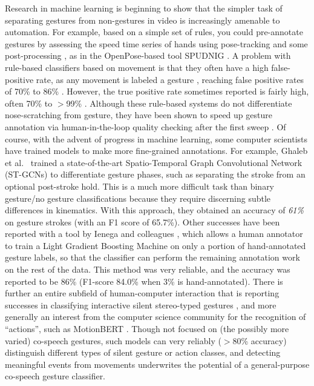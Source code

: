 \documentclass[11pt,smallheadings,cleardoublepage=empty,tocflat,numbers=noenddot,twoside,captions=tableheading]{scrbook}
\begin{document}
\begin{refsection}
Research in machine learning is beginning to show that the simpler task of separating gestures from non-gestures in video is increasingly amenable to automation. For example, based on a simple set of rules, you could pre-annotate gestures by assessing the speed time series of hands using pose-tracking and some post-processing \parencite{ripperdaSpeedingDetectionNoniconic2020, eijkCABBDatasetMultimodalundermajorrevision}, as in the OpenPose-based \parencite{caoOpenPoseRealtimeMultiPerson2021} tool SPUDNIG \parencite{ripperdaSpeedingDetectionNoniconic2020}. A problem with rule-based classifiers based on movement is that they often have a high false-positive rate, as any movement is labeled a gesture \parencite{pouwSemanticallyRelatedGestures2021}, reaching false positive rates of 70\% \parencite{ripperdaSpeedingDetectionNoniconic2020} to 86\% \parencite{pouwSemanticallyRelatedGestures2021}. However, the true positive rate sometimes reported is fairly high, often 70\% \parencite{pouwSemanticallyRelatedGestures2021} to $>$99\% \parencite{ripperdaSpeedingDetectionNoniconic2020}. Although these rule-based systems do not differentiate nose-scratching from gesture, they have been shown to speed up gesture annotation via human-in-the-loop quality checking after the first sweep \parencite{ripperdaSpeedingDetectionNoniconic2020}. Of course, with the advent of progress in machine learning, some computer scientists have trained models to make more fine-grained annotations. For example, Ghaleb et al.~\parencite{ghalebCoSpeechGestureDetection2024} trained a state-of-the-art Spatio-Temporal Graph Convolutional
Network (ST-GCNs) to differentiate gesture phases, such as separating the stroke from an optional post-stroke hold. This is a much more difficult task than binary gesture/no gesture classifications because they require discerning subtle differences in kinematics. With this approach, they obtained an accuracy of \textit{61\%} on gesture strokes (with an F1 score of 65.7\%). Other successes have been reported with a tool by Ienega and colleagues \parencite{ienagaSemiautomationGestureAnnotation2022}, which allows a human annotator to train a Light Gradient Boosting Machine on only a portion of hand-annotated gesture labels, so that the classifier can perform the remaining annotation work on the rest of the data. This method was very reliable, and the accuracy was reported to be 86\% (F1-score 84.0\% when 3\% is hand-annotated). There is further an entire subfield of human-computer interaction that is reporting successes in classifying interactive silent stereo-typed gestures \parencite{molchanovOnlineDetectionClassification2016, frontedduDynamicHandGesture2022}, and more generally an interest from the computer science community for the recognition of ``actions'', such as MotionBERT \parencite{zhuMotionBERTUnifiedPerspective2023}. Though not focused on (the possibly more varied) co-speech gestures, such models can very reliably ($>$80\% accuracy) distinguish different types of silent gesture or action classes, and detecting meaningful events from movements underwrites the potential of a general-purpose co-speech gesture classifier.


\end{refsection}
\end{document}
